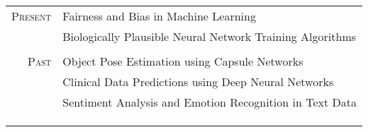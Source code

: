 \documentclass[a4paper,10pt]{article}
\begin{document}
\begin{tabularx}{\textwidth}{r|X}
\textsc{Present}& Fairness and Bias in Machine Learning \\[1ex]
& Biologically Plausible Neural Network Training Algorithms \\
\multicolumn{2}{c}{} \\
\textsc{Past} & Object Pose Estimation using Capsule Networks\\[1ex]
& Clinical Data Predictions using Deep Neural Networks\\[1ex]
& Sentiment Analysis and Emotion Recognition in Text Data\\
\multicolumn{2}{c}{} \\
\multicolumn{2}{c}{}\\
\hline
\multicolumn{2}{c}{} \\










\end{tabularx}
\end{document}
